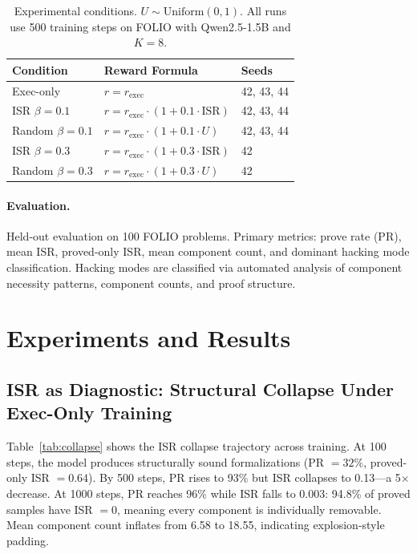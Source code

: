 \documentclass[11pt,a4paper]{article}
\begin{document}
\begin{table}[t]
\centering
\small
\begin{tabular}{lll}
\toprule
\textbf{Condition} & \textbf{Reward Formula} & \textbf{Seeds} \\
\midrule
Exec-only & $r = r_{\text{exec}}$ & 42, 43, 44 \\
ISR $\beta{=}0.1$ & $r = r_{\text{exec}} \cdot (1 + 0.1 \cdot \text{ISR})$ & 42, 43, 44 \\
Random $\beta{=}0.1$ & $r = r_{\text{exec}} \cdot (1 + 0.1 \cdot U)$ & 42, 43, 44 \\
ISR $\beta{=}0.3$ & $r = r_{\text{exec}} \cdot (1 + 0.3 \cdot \text{ISR})$ & 42 \\
Random $\beta{=}0.3$ & $r = r_{\text{exec}} \cdot (1 + 0.3 \cdot U)$ & 42 \\
\bottomrule
\end{tabular}
\caption{Experimental conditions. $U \sim \text{Uniform}(0,1)$. All runs use 500 training steps on FOLIO with Qwen2.5-1.5B and $K{=}8$.}
\label{tab:conditions}
\end{table}

\paragraph{Evaluation.}
Held-out evaluation on 100 FOLIO problems.
Primary metrics: prove rate (PR), mean ISR, proved-only ISR, mean component count, and dominant hacking mode classification.
Hacking modes are classified via automated analysis of component necessity patterns, component counts, and proof structure.

\section{Experiments and Results}
\label{sec:experiments}

\subsection{ISR as Diagnostic: Structural Collapse Under Exec-Only Training}
\label{sec:diagnostic}

Table~\ref{tab:collapse} shows the ISR collapse trajectory across training.
At 100 steps, the model produces structurally sound formalizations (PR $= 32\%$, proved-only ISR $= 0.64$).
By 500 steps, PR rises to 93\% but ISR collapses to 0.13---a 5$\times$ decrease.
At 1000 steps, PR reaches 96\% while ISR falls to 0.003: 94.8\% of proved samples have ISR $= 0$, meaning every component is individually removable.
Mean component count inflates from 6.58 to 18.55, indicating explosion-style padding.
\end{document}
